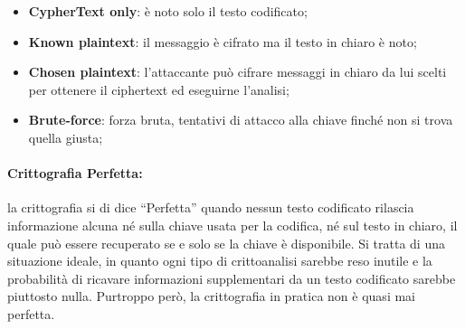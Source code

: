 \begin{itemize}
    \item \textbf{CypherText only}: è noto solo il testo codificato;
    \item \textbf{Known plaintext}: il messaggio è cifrato ma il testo in chiaro è noto;
    \item \textbf{Chosen plaintext}: l'attaccante può cifrare messaggi in chiaro da lui scelti per ottenere il ciphertext ed eseguirne l'analisi;
    \item \textbf{Brute-force}: forza bruta, tentativi di attacco alla chiave finché non si trova quella giusta;
\end{itemize}

\paragraph{Crittografia Perfetta: } la crittografia si di dice ``Perfetta'' quando
nessun
testo codificato rilascia informazione alcuna né
sulla chiave usata per la codifica, né sul testo in chiaro,
il quale può essere recuperato se e solo se
la chiave è disponibile.
Si tratta di una situazione ideale, in quanto ogni tipo di crittoanalisi sarebbe
reso inutile e la
probabilità di ricavare informazioni supplementari da un testo codificato
sarebbe piuttosto nulla.
Purtroppo però, la crittografia in pratica non è quasi mai perfetta.
